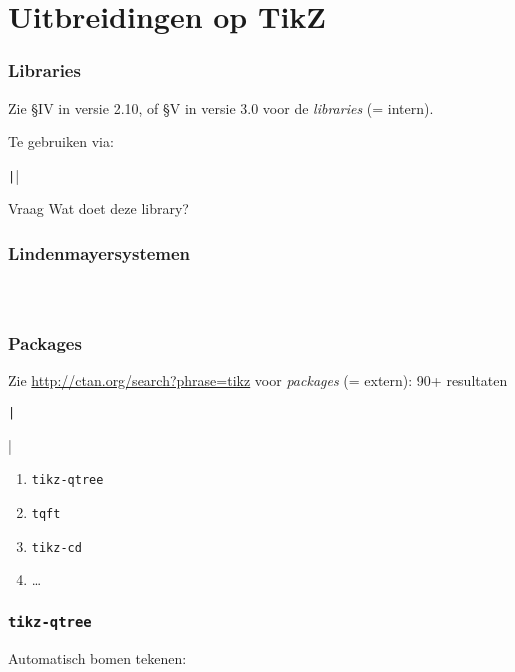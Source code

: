 \section{Uitbreidingen op TikZ}

\begin{frame}
  \frametitle{Libraries}

  Zie \S IV in versie 2.10, of \S V in versie 3.0 voor de \emph{libraries} (= intern).

  \pause
  Te gebruiken via:
  
  \texttt|\usetikzlibrary{lindenmayersystems}|

  \begin{alertblock}{Vraag}
    Wat doet deze library?
  \end{alertblock}
\end{frame}

\begin{frame}
  \frametitle{Lindenmayersystemen}

  \begin{columns}
    \begin{column}{.6\textwidth}
      \inputminted[fontsize = \scriptsize]{latex}{tikz/l-system.tikz}
    \end{column}
    \begin{column}{.4\textwidth}
      
    \end{column}
  \end{columns}
\end{frame}

\begin{frame}
  \frametitle{Packages}

  Zie \url{http://ctan.org/search?phrase=tikz} voor \emph{packages} (= extern): 90+ resultaten

  \texttt|\usepackage{...}|

  \pause
  \begin{enumerate}
    \item \texttt{tikz-qtree}
    \item \texttt{tqft}
    \item \texttt{tikz-cd}
    \item \ldots
  \end{enumerate}
\end{frame}

\begin{frame}
  \frametitle{\texttt{tikz-qtree}}
  
  Automatisch bomen tekenen:
  \begin{columns}
    \begin{column}{.6\textwidth}
      \inputminted[fontsize = \scriptsize]{latex}{tikz/tikz-qtree.tikz}
    \end{column}
    \begin{column}{.4\textwidth}
      
    \end{column}
  \end{columns}
\end{frame}

